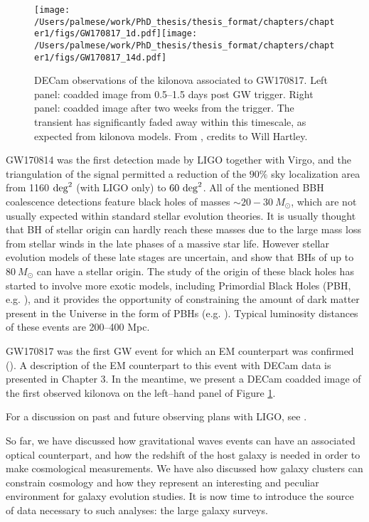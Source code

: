 \begin{figure}\centering
\texttt{[image: /Users/palmese/work/PhD\_thesis/thesis\_format/chapters/chapter1/figs/GW170817\_1d.pdf]}\texttt{[image: /Users/palmese/work/PhD\_thesis/thesis\_format/chapters/chapter1/figs/GW170817\_14d.pdf]}
\caption{DECam observations of the kilonova  associated to GW170817. Left panel: coadded image from 0.5--1.5 days post GW trigger. Right panel: coadded image after two weeks from the trigger. The transient has significantly faded away within this timescale, as expected from kilonova models. From \citet{marcelle17}, credits to Will Hartley.}\label{fig:bnsDECam}
\end{figure}

GW170814 was the first detection made by LIGO together with Virgo, and the triangulation of the signal permitted a reduction of the $90\%$ sky localization area from 1160 ${\rm deg}^2$ (with LIGO only) to $60~{\rm deg}^2$. All of the mentioned BBH coalescence detections feature black holes of masses $\sim 20-30~M_\odot$, which are not usually expected within standard stellar evolution theories. It is usually thought that BH of stellar origin can hardly reach these masses due to the large mass loss from stellar winds in the late phases of a massive star life. However stellar evolution models of these late stages are uncertain, and \citet{stellarBH} show that BHs of up to $80~M_\odot$ can have a stellar origin. The study of the origin of these black holes has started to involve more exotic models, including Primordial Black Holes (PBH, e.g. \citealt{pbh}), and it provides the opportunity of constraining the amount of dark matter present in the Universe in the form of PBHs (e.g. \citealt{2017JCAP...09..037R}). Typical luminosity distances of these events are 200--400 Mpc.

GW170817 was the first GW event for which an EM counterpart was confirmed (\citealt{MMApaper}). A description of the EM counterpart to this event with DECam data is presented in Chapter 3. In the meantime, we present a DECam coadded image of the first observed kilonova on the left--hand panel of Figure \ref{fig:bnsDECam}.

For a discussion on past and future observing plans with LIGO, see \citet{GWprospects}.

So far, we have discussed how gravitational waves events can have an associated optical counterpart, and how the redshift of the host galaxy is needed in order to make cosmological measurements. We have also discussed how galaxy clusters can constrain cosmology and how they represent an interesting and peculiar environment for galaxy evolution studies. It is now time to introduce the source of data necessary to such analyses: the large galaxy surveys.


